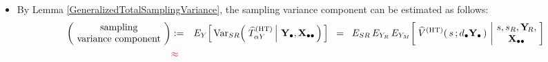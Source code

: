\begin{itemize}
\begin{eqnarray*}
            \,\right)
            \,\right]
    \\
    \left(\begin{array}{c}
        \textnormal{nonresponse}
        \\
        \textnormal{\;\,variance component\;\,}
        \end{array}\right)
    & := &
        E_{SR}\!\left[\,
        E_{Y}\!\left[
            \left.
            \left(\,\widetilde{T}_{\alpha Y} - \widehat{T}^{\textnormal{(HT)}}_{\alpha Y}\right)^{2}
            \,\right\vert\,
            s,s_{R},\Xobs
            \,\right]
            \,\right]
    \\
    \left(\begin{array}{c}
        \textnormal{sampling-nonresponse}
        \\
        \textnormal{covariance}
        \end{array}\right)
    & := &
        2\cdot
        E_{SR}\!\left[\,
        E_{Y}\!\left[
            \left.
            \left(\,\widetilde{T}_{\alpha Y} \,-\, \widehat{T}^{\textnormal{(HT)}}_{\alpha Y}\,\right)
            \!\!
            \left(\,\widehat{T}^{\textnormal{(HT)}}_{\alpha Y} \,-\, T_{\alpha Y}\,\right)
            \,\right\vert\,
            s,s_{R},\Xobs
            \,\right]
            \,\right]
    \end{eqnarray*}
\item
    By Lemma \ref{GeneralizedTotalSamplingVariance},
    the sampling variance component can be estimated as follows:
    \begin{eqnarray*}
    \left(\!\begin{array}{c}
        \textnormal{sampling}
        \\
        \textnormal{variance component}
        \end{array}\!\right)
    & := &
        E_{Y}\!\left[\,
        \Var_{SR}\!\left(\,
            \left.
            \widehat{T}^{\textnormal{(HT)}}_{\alpha Y}
            \,\right\vert\,
            \Ydot,
            \Xobs
            \,\right)
            \,\right]
    \;\; = \;\;
        E_{SR}\,
        E_{Y_{R}}\,
        E_{Y_{M}}\!\left[\;
            \widehat{V}^{\textnormal{(HT)}}(\,s\,;\dbullet\Ydot\,)
            \,\left\vert\!
            \begin{array}{c} s,s_{R},\YsubR, \\ \Xobs \end{array}
            \right.
            \!\!\right]
    \\
    & {\color{red}\approx} &

\end{eqnarray*}
\end{itemize}
